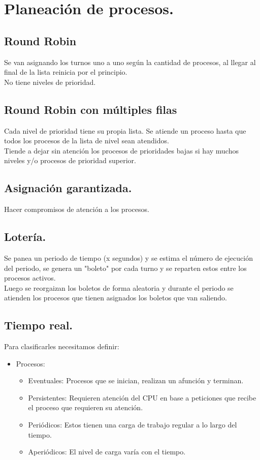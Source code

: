 \newpage

\chapter{Planeaci\'{o}n de procesos.}

\section{Round Robin}
Se van asignando los turnos uno a uno seg\'{u}n la cantidad de procesos, al llegar al final de la lista reinicia por el principio. \\
No tiene niveles de prioridad. \\
\section{Round Robin con m\'{u}ltiples filas}
Cada nivel de prioridad tiene su propia lista. Se atiende un proceso hasta que todos los procesos de la lista de nivel sean atendidos.\\
Tiende a dejar sin atenci\'{o}n los procesos de prioridades bajas si hay muchos niveles y/o procesos de prioridad superior.\\

\section{Asignaci\'{o}n garantizada.}
Hacer compromisos de atenci\'{o}n a los procesos.\\

\section{Loter\'{i}a.}
Se panea un periodo de tiempo (x segundos) y se estima el n\'{u}mero de ejecuci\'{o}n del periodo, se genera un "boleto" por cada turno y se reparten estos entre los procesos activos.\\
Luego se reorgaizan los boletos de forma aleatoria y durante el periodo se atienden los procesos que tienen asignados los boletos que van saliendo.\\
\section{Tiempo real.}
Para clasificarles necesitamos definir:\\
\begin{itemize}
	\item Procesos:
	\begin{itemize}
		\item Eventuales: Procesos que se inician, realizan un afunci\'{o}n y terminan.
		\item Persistentes: Requieren atenci\'{o}n del CPU en base a peticiones que recibe el proceso que requieren su atenci\'{o}n.
		\item Peri\'{o}dicos: Estos tienen una carga de trabajo regular a lo largo del tiempo.
		\item Aperi\'{o}dicos: El nivel de carga var\'{i}a con el tiempo.
	\end{itemize}
\end{itemize}

